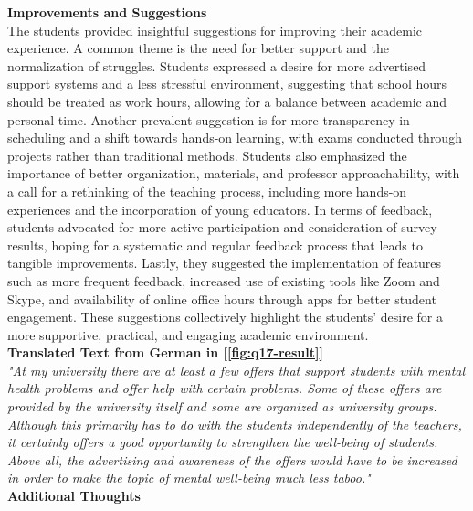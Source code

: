 \documentclass[11pt]{report}
\begin{document}
\textbf{Improvements and Suggestions} \\
The students provided insightful suggestions for improving their academic experience. A common theme is the need for better support and the normalization of struggles. Students expressed a desire for more advertised support systems and a less stressful environment, suggesting that school hours should be treated as work hours, allowing for a balance between academic and personal time. Another prevalent suggestion is for more transparency in scheduling and a shift towards hands-on learning, with exams conducted through projects rather than traditional methods. Students also emphasized the importance of better organization, materials, and professor approachability, with a call for a rethinking of the teaching process, including more hands-on experiences and the incorporation of young educators. In terms of feedback, students advocated for more active participation and consideration of survey results, hoping for a systematic and regular feedback process that leads to tangible improvements. Lastly, they suggested the implementation of features such as more frequent feedback, increased use of existing tools like Zoom and Skype, and availability of online office hours through apps for better student engagement. These suggestions collectively highlight the students' desire for a more supportive, practical, and engaging academic environment.\vspace{5mm} \\
\textbf{Translated Text from German in [\ref{fig:q17-result}]} \\
\textit{"At my university there are at least a few offers that support students with mental health problems and offer help with certain problems. Some of these offers are provided by the university itself and some are organized as university groups. Although this primarily has to do with the students independently of the teachers, it certainly offers a good opportunity to strengthen the well-being of students. Above all, the advertising and awareness of the offers would have to be increased in order to make the topic of mental well-being much less taboo."} \vspace{5mm} \\
\textbf{Additional Thoughts} \\
\end{document}
